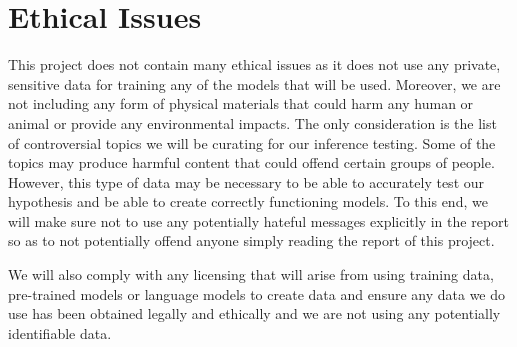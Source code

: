 \chapter{Ethical Issues}

This project does not contain many ethical issues as it does not use any private, sensitive data for training any of the models that will be used. Moreover, 
we are not including any form of physical materials that could harm any human or animal or provide any environmental impacts. The only consideration is the
list of controversial topics we will be curating for our inference testing. Some of the topics may produce harmful content that could offend certain groups
of people. However, this type of data may be necessary to be able to accurately test our hypothesis and be able to create correctly functioning models. To this 
end, we will make sure not to use any potentially hateful messages explicitly in the report so as to not potentially offend anyone simply reading the report of this
project.

We will also comply with any licensing that will arise from using training data, pre-trained models or language models to create data and ensure any data we do use has
been obtained legally and ethically and we are not using any potentially identifiable data.